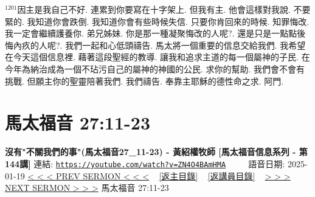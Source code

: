 \documentclass{book}
\begin{document}
$^{1201}$因主是我自己不好.
連累到你要寫在十字架上.
但我有主.
他會這樣對我說.
不要緊的.
我知道你會跌倒.
我知道你會有些時候失信.
只要你肯回來的時候.
知罪悔改.
我一定會繼續護養你.
弟兄姊妹.
你是那一種凝聚悔改的人呢?.
還是只是一點點後悔內疚的人呢?.
我們一起和心低頭禱告.
馬太將一個重要的信息交給我們.
我希望在今天這個信息裡.
藉著這段聖經的教導.
讓我和追求主道的每一個屬神的子民.
在今年為納治成為一個不玷污自己的屬神的神國的公民.
求你的幫助.
我們會不會有挑戰.
但願主你的聖靈陪著我們.
我們禱告.
奉靠主耶穌的德性命之求.
阿門.
\newpage



\section{馬太福音 27:11-23}
\label{sec:ZN4O4BAmHMA}
\textbf{沒有"不關我們的事"(馬太福音27\_11-23) -  黃紹權牧師 [馬太福音信息系列 - 第144講]}
\newline
\newline
連結: \href{https://youtube.com/watch?v=ZN4O4BAmHMA}{\texttt{https://youtube.com/watch?v=ZN4O4BAmHMA}} ~~~~ 語音日期: 2025-01-19
\newline
\newline
\hyperref[sec:499K9je19EI]{< < < PREV SERMON < < <}
~
\hyperlink{toc}{[返主目錄]}
~
\hyperref[ch:preacher16]{[返講員目錄]}
~
\hyperref[sec:HaaLhKYBRSg]{> > > NEXT SERMON > > >}
\newline
\newline
馬太福音 27:11-23
\newline
\end{document}
